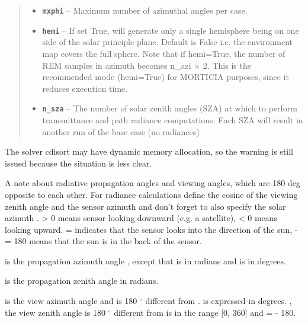 \documentclass[a4paper,10pt,english]{sphinxmanual}
\begin{document}
\begin{fulllineitems}
\begin{quote}
\begin{description}
\begin{itemize}
\item {} 
\textbf{\texttt{mxphi}} -- Maximum number of azimuthal angles per case.

\item {} 
\textbf{\texttt{hemi}} -- If set True, will generate only a single hemisphere being on one side of
the solar principle plane. Default is False i.e. the environment map covers the full sphere.
Note that if hemi=True, the number of REM samples in azimuth becomes n\_azi \(\times\) 2.
This is the recommended mode (hemi=True) for MORTICIA purposes, since it reduces execution time.

\item {} 
\textbf{\texttt{n\_sza}} -- The number of solar zenith angles (SZA) at which to perform transmittance and path radiance
computations. Each SZA will result in another run of the base case (no radiances)

\end{itemize}

\end{description}\end{quote}

The solver cdisort may have dynamic memory allocation, so the warning is still issued because the situation
is less clear.

A note about radiative propagation angles and viewing angles, which are 180 deg opposite to each other.
For radiance calculations define the cosine of the viewing zenith angle
 and the sensor azimuth  and don't forget to also specify the solar azimuth
.  \textgreater{} 0 means sensor looking downward (e.g. a satellite),  \textless{} 0 means looking
upward.  =  indicates that the sensor looks into the direction of the sun,
 -  = 180 means that the sun is in the back of the sensor.

 is the propagation azimuth angle , except that  is in radians and  is in degrees.

 is the propagation zenith angle in radians.

 is the view azimuth angle and is 180 \(^\circ\) different from .  is expressed
in degrees. , the view zenith angle is 180 \(^\circ\) different from  is in the range {[}0, 360{]} and  =  - 180.


\end{fulllineitems}
\end{document}
